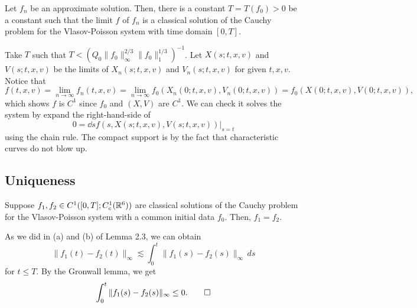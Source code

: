 \documentclass{article}
\begin{document}
\begin{thm}
Let $f_n$ be an approximate solution.
Then, there is a constant $T=T(f_0)>0$ be a constant such that the limit $f$ of $f_n$ is a classical solution of the Cauchy problem for the Vlasov-Poisson system with time domain $[0,T]$.
\end{thm}
\begin{pf}
Take $T$ such that $T<(Q_0\|f_0\|_\infty^{2/3}\|f_0\|_1^{1/3})^{-1}$.
Let $X(s;t,x,v)$ and $V(s;t,x,v)$ be the limits of $X_n(s;t,x,v)$ and $V_n(s;t,x,v)$ for given $t,x,v$.
Notice that
\[f(t,x,v)=\lim_{n\to\infty}f_n(t,x,v)=\lim_{n\to\infty}f_0(X_n(0;t,x,v),V_n(0;t,x,v))=f_0(X(0;t,x,v),V(0;t,x,v)),\]
which shows $f$ is $C^1$ since $f_0$ and $(X,V)$ are $C^1$.
We can check it solves the system by expand the right-hand-side of
\[0=\dd{s}f(s,X(s;t,x,v),V(s;t,x,v))|_{s=t}\]
using the chain rule.
The compact support is by the fact that characteristic curves do not blow up.
\end{pf}


\subsection{Uniqueness}
\begin{thm}[Uniqueness]
Suppose $f_1,f_2\in C^1([0,T];C_c^1(\mathbb{R}^6))$ are classical solutions of the Cauchy problem for the Vlasov-Poisson system with a common initial data $f_0$.
Then, $f_1=f_2$.
\end{thm}
\begin{pf}
As we did in (a) and (b) of Lemma 2.3, we can obtain
\[\|f_1(t)-f_2(t)\|_\infty\lesssim\int_0^t\|f_1(s)-f_2(s)\|_\infty\,ds\]
for $t\le T$.
By the Gronwall lemma, we get
\[\int_0^t\|f_1(s)-f_2(s)\|_\infty\le0.\qedhere\]
\end{pf}
\end{document}

